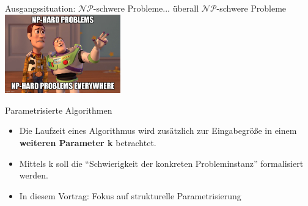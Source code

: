 \begin{frame}{Ausgangssituation: $\mathcal{NP}$-schwere Probleme... überall $\mathcal{NP}$-schwere Probleme}
        \centering
        \includegraphics[width=5cm]{logos/np-everywhere.jpg}
    

    
\end{frame}

\begin{frame}{Parametrisierte Algorithmen}

    \begin{itemize}
        \item Die Laufzeit eines Algorithmus wird zusätzlich zur Eingabegröße in einem \textbf{weiteren Parameter k} betrachtet.
        \item Mittels k soll die \enquote{Schwierigkeit der konkreten Probleminstanz} formalisiert werden.
        \item In diesem Vortrag: Fokus auf strukturelle Parametrisierung
    \end{itemize}

    \vspace{1cm}
    \centering
\end{frame}

